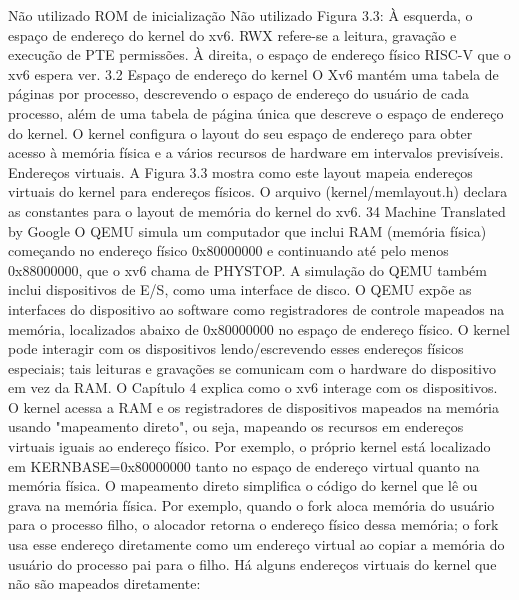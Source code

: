  Não  utilizado
 ROM  de  inicialização
 Não  utilizado
 Figura  3.3:  À  esquerda,  o  espaço  de  endereço  do  kernel  do  xv6.  RWX  refere-se  a  leitura,  gravação  e  execução  de  PTE
 permissões.  À  direita,  o  espaço  de  endereço  físico  RISC-V  que  o  xv6  espera  ver.
 3.2  Espaço  de  endereço  do  kernel
 O  Xv6  mantém  uma  tabela  de  páginas  por  processo,  descrevendo  o  espaço  de  endereço  do  usuário  de  cada  processo,  além  de  
uma  tabela  de  página  única  que  descreve  o  espaço  de  endereço  do  kernel.  O  kernel  configura  o  layout  do  seu  espaço  de  endereço  
para  obter  acesso  à  memória  física  e  a  vários  recursos  de  hardware  em  intervalos  previsíveis.
 Endereços  virtuais.  A  Figura  3.3  mostra  como  este  layout  mapeia  endereços  virtuais  do  kernel  para  endereços  físicos.  O  arquivo  
(kernel/memlayout.h)  declara  as  constantes  para  o  layout  de  memória  do  kernel  do  xv6.
 34
Machine Translated by Google
 O  QEMU  simula  um  computador  que  inclui  RAM  (memória  física)  começando  no  endereço  físico  0x80000000  e  
continuando  até  pelo  menos  0x88000000,  que  o  xv6  chama  de  PHYSTOP.
 A  simulação  do  QEMU  também  inclui  dispositivos  de  E/S,  como  uma  interface  de  disco.  O  QEMU  expõe  as  interfaces  do  
dispositivo  ao  software  como  registradores  de  controle  mapeados  na  memória,  localizados  abaixo  de  0x80000000  no  
espaço  de  endereço  físico.  O  kernel  pode  interagir  com  os  dispositivos  lendo/escrevendo  esses  endereços  físicos  especiais;  
tais  leituras  e  gravações  se  comunicam  com  o  hardware  do  dispositivo  em  vez  da  RAM.  O  Capítulo  4  explica  como  o  xv6  
interage  com  os  dispositivos.
 O  kernel  acessa  a  RAM  e  os  registradores  de  dispositivos  mapeados  na  memória  usando  "mapeamento  direto",  ou  
seja,  mapeando  os  recursos  em  endereços  virtuais  iguais  ao  endereço  físico.  Por  exemplo,  o  próprio  kernel  está  localizado  
em  KERNBASE=0x80000000  tanto  no  espaço  de  endereço  virtual  quanto  na  memória  física.  O  mapeamento  direto  
simplifica  o  código  do  kernel  que  lê  ou  grava  na  memória  física.  Por  exemplo,  quando  o  fork  aloca  memória  do  usuário  
para  o  processo  filho,  o  alocador  retorna  o  endereço  físico  dessa  memória;  o  fork  usa  esse  endereço  diretamente  como  
um  endereço  virtual  ao  copiar  a  memória  do  usuário  do  processo  pai  para  o  filho.
 Há  alguns  endereços  virtuais  do  kernel  que  não  são  mapeados  diretamente:
